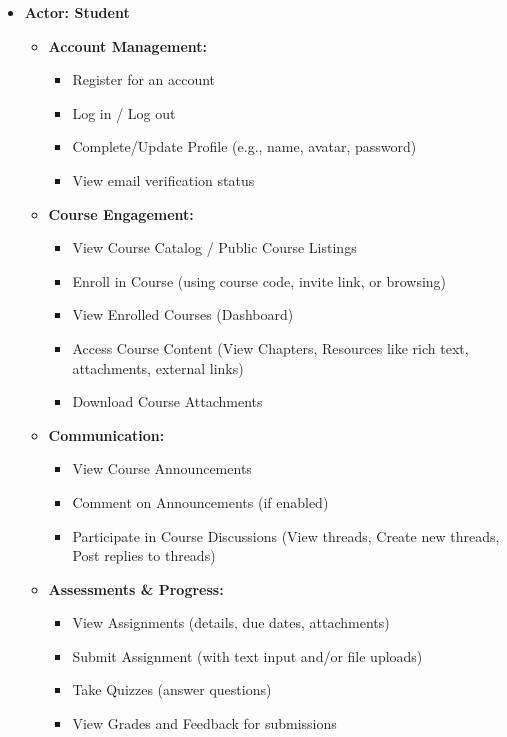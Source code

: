 \begin{itemize}
    \item \textbf{Actor: Student}
    \begin{itemize}
        \item \textbf{Account Management:}
        \begin{itemize}
            \item Register for an account
            \item Log in / Log out
            \item Complete/Update Profile (e.g., name, avatar, password)
            \item View email verification status
        \end{itemize}
        \item \textbf{Course Engagement:}
        \begin{itemize}
            \item View Course Catalog / Public Course Listings
            \item Enroll in Course (using course code, invite link, or browsing)
            \item View Enrolled Courses (Dashboard)
            \item Access Course Content (View Chapters, Resources like rich text, attachments, external links)
            \item Download Course Attachments
        \end{itemize}
        \item \textbf{Communication:}
        \begin{itemize}
            \item View Course Announcements
            \item Comment on Announcements (if enabled)
            \item Participate in Course Discussions (View threads, Create new threads, Post replies to threads)
        \end{itemize}
        \item \textbf{Assessments \& Progress:}
        \begin{itemize}
            \item View Assignments (details, due dates, attachments)
            \item Submit Assignment (with text input and/or file uploads)
            \item Take Quizzes (answer questions)
            \item View Grades and Feedback for submissions

\end{itemize}
\end{itemize}
\end{itemize}
